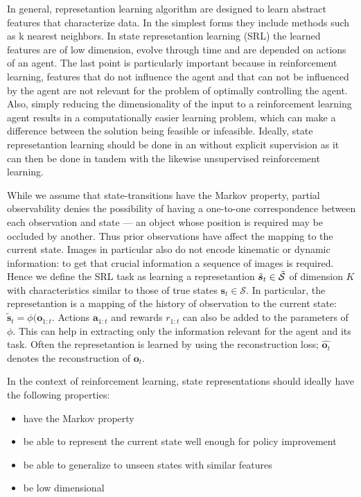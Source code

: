 In general, represetantion learning algorithm are designed to learn
abstract features that characterize data.
In the simplest forms they include methods such as k nearest neighbors.
In state represetantion learning (SRL) the learned features
are of low dimension, evolve through time and are depended
on actions of an agent.
The last point is particularly important because in reinforcement learning,
features that do not influence the agent and that can not be influenced
by the agent are not relevant for the problem of optimally controlling the agent.
Also, simply reducing the dimensionality of the input to a reinforcement learning
agent results in a computationally easier learning problem,
which can make a difference between the solution being feasible or infeasible.
Ideally, state  represetantion learning should be done in an without explicit supervision
as it can then be done in tandem with the likewise unsupervised reinforcement learning.

While we assume that state-transitions have the Markov property,
partial observability denies the possibility of having a one-to-one
correspondence between each observation and state ---
an object whose position is required may be occluded by another.
Thus prior observations have affect the mapping to the current state.
Images in particular also do not encode kinematic or dynamic information:
to get that crucial information a sequence of images is required.
Hence we define the SRL task as learning
a represetantion $ \tilde{\bm{s}}_{t} \in \tilde{\cal{S}}  $ of dimension $ K  $
with characteristics similar to those of true states $ \bm{s}_{t} \in \mathcal{S} $.
In particular, the represetantion is a mapping of the history of 
observation to the current state: $ \tilde{\bm{s}}_{t} = \phi(\bm{o}_{1:t}  $.
Actions $ \bm{a}_{1:t}  $ and rewards $ r_{ 1:t }  $ can also be added
to the parameters of $ \phi  $.
This can help in extracting only the information relevant for the agent and its task.
Often the represetantion is learned by using the reconstruction loss;
$ \hat{\bm{o}_{t}}  $ denotes the reconstruction of $ \bm{o}_{t}  $.

In the context of reinforcement learning, state representations should
ideally have the following properties:
\begin{itemize}
		\item have the Markov property 
		\item be able to represent the current state well enough for policy improvement
		\item be able to generalize to unseen states with similar features
		\item be low dimensional
\end{itemize}

